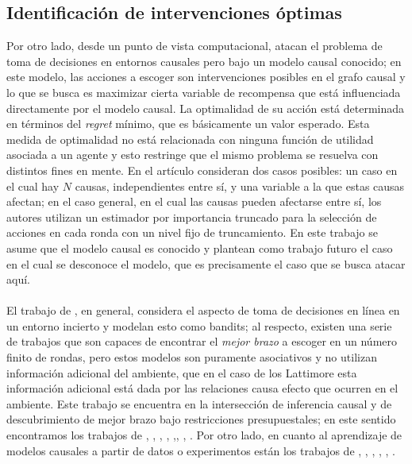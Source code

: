 \documentclass[11pt]{article}
\theoremstyle{plain}
\begin{document}
\subsection{Identificación de intervenciones óptimas}
\indent Por otro lado, desde un punto de vista computacional, \cite{lattimoreNIPS2016} atacan el problema de toma de decisiones en entornos causales pero bajo un modelo causal conocido; en este modelo, las acciones a escoger son intervenciones posibles en el grafo causal y lo que se busca es maximizar cierta variable de recompensa que está influenciada directamente por el modelo causal. La optimalidad de su acción está determinada en términos del \textit{regret} mínimo, que es básicamente un valor esperado. Esta medida de optimalidad no está relacionada con ninguna función de utilidad asociada a un agente y esto restringe que el mismo problema se resuelva con distintos fines en mente. En el artículo consideran dos casos posibles: un caso en el cual hay $N$ causas, independientes entre sí, y una variable a la que estas causas afectan; en el caso general, en el cual las causas pueden afectarse entre sí, los autores utilizan un estimador por importancia truncado para la selección de acciones en cada ronda con un nivel fijo de truncamiento. En este trabajo se asume que el modelo causal es conocido y plantean como trabajo futuro el caso en el cual se desconoce el modelo, que es precisamente el caso que se busca atacar aquí.\\
\\
\indent El trabajo de \cite{lattimoreNIPS2016}, en general, considera el aspecto de toma de decisiones en línea en un entorno incierto y modelan esto como bandits; al respecto, existen una serie de trabajos que son capaces de encontrar el \textit{mejor brazo} a escoger en un número finito de rondas, pero estos modelos son puramente asociativos y no utilizan información adicional del ambiente, que en el caso de los Lattimore esta información adicional está dada por las relaciones causa efecto que ocurren en el ambiente. Este trabajo se encuentra en la intersección de inferencia causal y de descubrimiento de mejor brazo bajo restricciones presupuestales; en este sentido encontramos los trabajos de \cite{audibert2010best}, \cite{jamieson2014lil},  \cite{jamieson2014best},  \cite{ortega2014generalized}, \cite{chen2015optimal},\cite{carpentier2016tight},  \cite{russo2016simple},  \cite{kaufmann2016complexity}. Por otro lado, en cuanto al aprendizaje de modelos causales a partir de datos o experimentos están los trabajos de \cite{eberhardt2008almost}, \cite{mooij2016distinguishing}, \cite{hyttinen2013experiment}, \cite{hauser2012two}, \cite{loh2014high}, \cite{shanmugam2015learning}.\\
\end{document}
